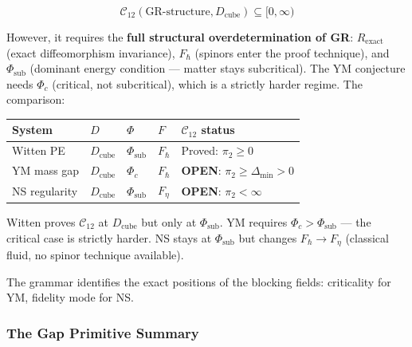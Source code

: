 \documentclass[12pt,a4paper]{article}
\begin{document}
\[\mathcal{C}_{12}(\text{GR-structure}, D_\text{cube}) \subseteq [0, \infty)\]

However, it requires the \textbf{full structural overdetermination of GR}: $R_\text{exact}$ (exact diffeomorphism invariance), $F_{\hbar}$ (spinors enter the proof technique), and $\Phi_\text{sub}$ (dominant energy condition --- matter stays subcritical). The YM conjecture needs $\Phi_c$ (critical, not subcritical), which is a strictly harder regime. The comparison:

\begin{table}[htbp]
\centering
\small
{}
\begin{tabularx}{\textwidth}{>{\centering\arraybackslash}X >{\centering\arraybackslash}X >{\centering\arraybackslash}X >{\centering\arraybackslash}X >{\centering\arraybackslash}X}
\toprule
\rowcolor{gray!25}\textbf{System} & \textbf{$D$} & \textbf{$\Phi$} & \textbf{$F$} & \textbf{$\mathcal{C}_{12}$ status} \\
\midrule
\rowcolors{1}{white}{gray!10}
Witten PE & $D_\text{cube}$ & $\Phi_\text{sub}$ & $F_{\hbar}$ &  Proved: $\pi_2 \geq 0$ \\
YM mass gap & $D_\text{cube}$ & $\Phi_c$ & $F_{\hbar}$ & \textbf{OPEN}: $\pi_2 \geq \Delta_\text{min} > 0$ \\
NS regularity & $D_\text{cube}$ & $\Phi_\text{sub}$ & $F_{\eta}$ & \textbf{OPEN}: $\pi_2 < \infty$ \\
\bottomrule
\end{tabularx}
\end{table}

Witten proves $\mathcal{C}_{12}$ at $D_\text{cube}$ but only at $\Phi_\text{sub}$. YM requires $\Phi_c > \Phi_\text{sub}$ --- the critical case is strictly harder. NS stays at $\Phi_\text{sub}$ but changes $F_{\hbar} \to F_{\eta}$ (classical fluid, no spinor technique available).

The grammar identifies the exact positions of the blocking fields: criticality for YM, fidelity mode for NS.

\subsubsection{The Gap Primitive Summary}
\end{document}
